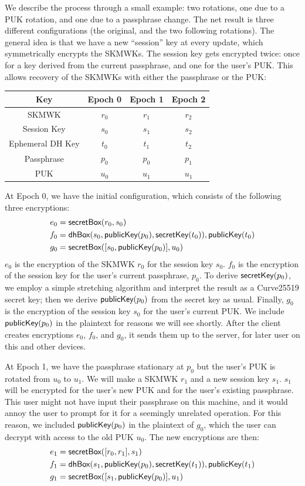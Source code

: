 We describe the process through a small example: two rotations, one due to a PUK rotation,
and one due to a passphrase change. The net result is three different configurations
(the original, and the two following rotations). The general idea is that we have a new ``session''
key at every update, which symmetrically encrypts the SKMWKs. The session key gets encrypted
twice: once for a key derived from the current passphrase, and one for the user's PUK. This
allows recovery of the SKMWKs with either the passphrase or the PUK:
%
  \begin{center}
  \begin{tabular}{|c|c|c|c|}
    \hline
     Key & Epoch 0 & Epoch 1 & Epoch 2 \\
     \hline
     \hline
      SKMWK & $r_0$ & $r_1$ & $r_2$ \\
      Session Key & $s_0$ & $s_1$ & $s_2$ \\
      Ephemeral DH Key & $t_0$ & $t_1$ & $t_2$ \\
      Passphrase & $p_0$ & $p_0$ & $p_1$ \\
      PUK & $u_0$ & $u_1$ & $u_1$ \\
     \hline
  \end{tabular}
\end{center}
%
At Epoch 0, we have the initial configuration, which consists of the following three encryptions:
%
\begin{align*}
e_0 &= \textsf{secretBox}(r_0, s_0) \\
f_0 &= \textsf{dhBox}(s_0, \textsf{publicKey}(p_0), \textsf{secretKey}(t_0)), \textsf{publicKey}(t_0) \\
g_0 &= \textsf{secretBox}([s_0,\textsf{publicKey}(p_0)], u_0) \\
\end{align*}
%
$e_0$ is the encryption of the SKMWK $r_0$ for the session key $s_0$.  $f_0$ is the encryption 
of the session key for the user's current passphrase, $p_0$. To derive $\textsf{secretKey}(p_0)$, we employ
a simple stretching algorithm and interpret the result as a Curve25519 secret key; then we
derive $\textsf{publicKey}(p_0)$ from the secret key as usual. Finally, $g_0$ is the encryption of the session
key $s_0$ for the user's current PUK. We include $\textsf{publicKey}(p_0)$ in the plaintext for reasons
we will see shortly. After the client creates encryptions $e_0$, $f_0$, and $g_0$, it sends them
up to the server, for later user on this and other devices.

At Epoch 1, we have the passphrase stationary at $p_0$  but the user's PUK is rotated from $u_0$ to $u_1$.
We will make a SKMWK $r_1$ and a new session key $s_1$. $s_1$ will be encrypted for the user's
new PUK and for the user's existing passphrase. This user might not have input their
passphrase on this machine, and it would annoy the user to prompt for it for a seemingly
unrelated operation. For this reason, we included $\textsf{publicKey}(p_0)$ in the plaintext of $g_0$, which
the user can decrypt with access to the old PUK $u_0$. The new encryptions are then:
%
\begin{align*}
e_1 &= \textsf{secretBox}([r_0,r_1], s_1) \\
f_1 &= \textsf{dhBox}(s_1, \textsf{publicKey}(p_0), \textsf{secretKey}(t_1)), \textsf{publicKey}(t_1) \\
g_1 &= \textsf{secretBox}([s_1,\textsf{publicKey}(p_0)], u_1) \\
\end{align*}

